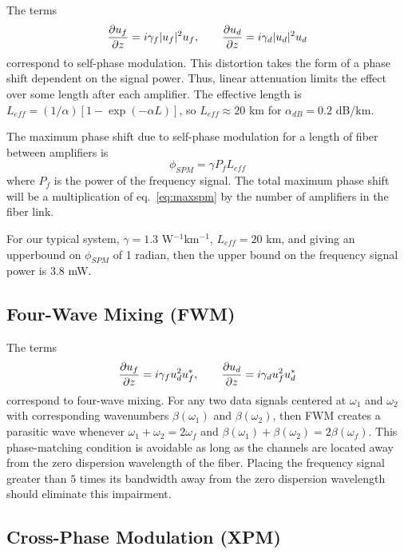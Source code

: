 The terms
\begin{equation*}
\frac{\partial u_f}{\partial z} = i\gamma_f|u_f|^2u_f, \qquad
\frac{\partial u_d}{\partial z} = i\gamma_d|u_d|^2u_d
\end{equation*}
correspond to self-phase modulation. This distortion takes the form of a phase shift dependent on the signal power. Thus, linear attenuation limits the effect over some length after each amplifier. The effective length is $L_{eff} = (1/\alpha)[1-\exp(-\alpha L)]$, so $L_{eff} \approx 20$ km for $\alpha_{dB} = 0.2$ dB/km.

The maximum phase shift due to self-phase modulation for a length of fiber between amplifiers is
%
\begin{equation} \label{eq:maxspm}
\phi_{SPM} = \gamma P_f L_{eff}
\end{equation}
%
where $P_f$ is the power of the frequency signal. The total maximum phase shift will be a multiplication of eq.~\ref{eq:maxspm} by the number of amplifiers in the fiber link.

For our typical system, $\gamma = 1.3$ W$^{-1}$km$^{-1}$, $L_{eff} = 20$ km, and giving an upperbound on $\phi_{SPM}$ of 1 radian, then the upper bound on the frequency signal power is $3.8$ mW.

\subsection{Four-Wave Mixing (FWM)}

The terms
\begin{equation*}
\frac{\partial u_f}{\partial z} = i\gamma_f u_d^2u_f^*, \qquad \frac{\partial u_d}{\partial z} = i\gamma_d u_f^2u_d^*
\end{equation*}
correspond to four-wave mixing. For any two data signals centered at $\omega_1$ and $\omega_2$ with corresponding wavenumbers $\beta(\omega_1)$ and $\beta(\omega_2)$, then FWM creates a parasitic wave whenever $\omega_1 + \omega_2 = 2\omega_f$ and $\beta(\omega_1) + \beta(\omega_2) = 2\beta(\omega_f)$. This phase-matching condition is avoidable as long as the channels are located away from the zero dispersion wavelength of the fiber. Placing the frequency signal greater than $5$ times its bandwidth away from the zero dispersion wavelength should eliminate this impairment.

\subsection{Cross-Phase Modulation (XPM)}

